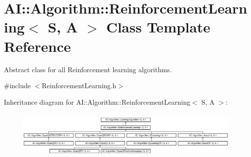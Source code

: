\hypertarget{classAI_1_1Algorithm_1_1ReinforcementLearning}{\section{A\-I\-:\-:Algorithm\-:\-:Reinforcement\-Learning$<$ S, A $>$ Class Template Reference}
\label{classAI_1_1Algorithm_1_1ReinforcementLearning}
}


Abstract class for all Reinforcement learning algorithms.  




{\ttfamily \#include $<$Reinforcement\-Learning.\-h$>$}

Inheritance diagram for A\-I\-:\-:Algorithm\-:\-:Reinforcement\-Learning$<$ S, A $>$\-:\begin{figure}[H]
\begin{center}
\leavevmode
\includegraphics[height=2.397260cm]{classAI_1_1Algorithm_1_1ReinforcementLearning}
\end{center}
\end{figure}
